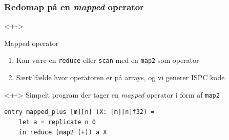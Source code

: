 \documentclass[t]{beamer}
\begin{document}
\begin{frame}[fragile]
  \frametitle{Redomap på en \textit{mapped} operator}
  \begin{onlyenv}<+->
    \begin{block}{Mapped operator}
      \begin{enumerate}
        \item Kan være en \texttt{reduce} eller \texttt{scan} med en \texttt{map2} som operator
        \item Særtilfælde hvor operatoren er på arrays, og vi generer ISPC kode
      \end{enumerate}
    \end{block}
  \end{onlyenv}
  \begin{onlyenv}<+->
    Simpelt program der tager en \textit{mapped} operator i form af \texttt{map2}
\begin{lstlisting}[language=futhark]
  entry mapped_plus [m][n] (X: [m][n]f32) =
    let a = replicate n 0
    in reduce (map2 (+)) a X

\end{lstlisting}
  \end{onlyenv}
\end{frame}
\end{document}
